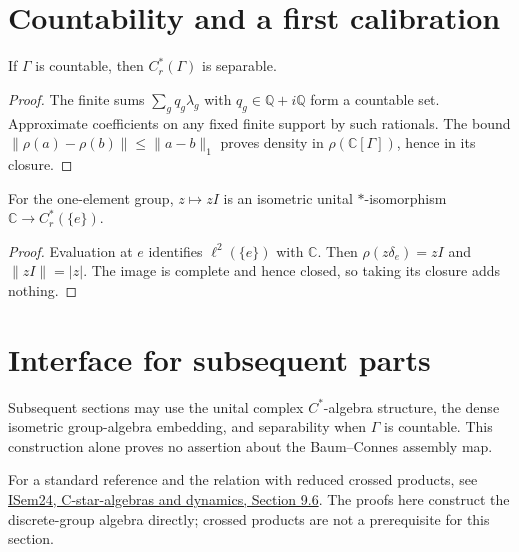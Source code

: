 \section{Countability and a first calibration}

\begin{proposition}[Separability]\label{prop:reduced-group-cstar-separable}
\leanok
{}
If $\Gamma$ is countable, then $C_r^*(\Gamma)$ is separable.
\end{proposition}
\begin{proof}
\leanok
The finite sums $\sum_g q_g\lambda_g$ with $q_g\in\mathbb Q+i\mathbb Q$
form a countable set. Approximate coefficients on any fixed finite support
by such rationals. The bound
$\|\rho(a)-\rho(b)\|\leq\|a-b\|_1$ proves density in
$\rho(\mathbb C[\Gamma])$, hence in its closure.
\end{proof}

\begin{proposition}\label{prop:reduced-group-cstar-trivial}
\leanok
{}
For the one-element group, $z\mapsto zI$ is an isometric unital
$*$-isomorphism $\mathbb C\to C_r^*(\{e\})$.
\end{proposition}
\begin{proof}
\leanok
Evaluation at $e$ identifies $\ell^2(\{e\})$ with $\mathbb C$.
Then $\rho(z\delta_e)=zI$ and $\|zI\|=|z|$.
The image is complete and hence closed, so taking its closure adds nothing.
\end{proof}

\section{Interface for subsequent parts}
Subsequent sections may use the unital complex $C^*$-algebra structure,
the dense isometric group-algebra embedding, and separability when
$\Gamma$ is countable. This construction alone proves no assertion
about the Baum--Connes assembly map.

For a standard reference and the relation with reduced crossed products,
see \href{https://www.math.uni-sb.de/ag/speicher/weber/ISem24/ISem24LectureNotes.pdf}
{ISem24, C-star-algebras and dynamics, Section 9.6}.
The proofs here construct the discrete-group algebra directly; crossed
products are not a prerequisite for this section.
